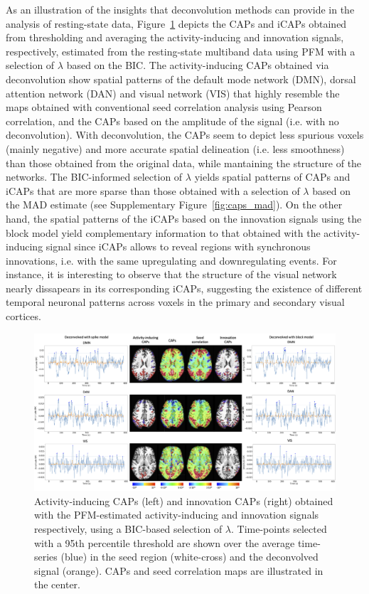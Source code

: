 As an illustration of the insights that deconvolution methods can provide in the analysis of resting-state data, Figure~\ref{fig:caps} depicts the CAPs and iCAPs obtained from thresholding and averaging the activity-inducing and innovation signals, respectively, estimated from the resting-state multiband data using PFM with a selection of $\lambda$ based on the BIC. The activity-inducing CAPs obtained via deconvolution show spatial patterns of the default mode network (DMN), dorsal attention network (DAN) and visual network (VIS) that highly resemble the maps obtained with conventional seed correlation analysis using Pearson correlation, and the CAPs based on the amplitude of the signal (i.e. with no deconvolution). With deconvolution, the CAPs seem to depict less spurious voxels (mainly negative) and more accurate spatial delineation (i.e. less smoothness) than those obtained from the original data, while mantaining the structure of the networks. The BIC-informed selection of $\lambda$ yields spatial patterns of CAPs and iCAPs that are more sparse than those obtained with a selection of $\lambda$ based on the MAD estimate (see Supplementary Figure~\ref{fig:caps_mad}). On the other hand, the spatial patterns of the iCAPs based on the innovation signals using the block model yield complementary information to that obtained with the activity-inducing signal since iCAPs allows to reveal regions with synchronous innovations, i.e. with the same upregulating and downregulating events. For instance, it is interesting to observe that the structure of the visual network nearly dissapears in its corresponding iCAPs, suggesting the existence of different temporal neuronal patterns across voxels in the primary and secondary visual cortices. 

\begin{figure}[t!]
    \begin{center}
        \includegraphics[width=\textwidth]{figures/caps.png}
    \end{center}
    \caption{Activity-inducing CAPs (left) and innovation CAPs (right) obtained with the PFM-estimated activity-inducing and innovation signals respectively, using a BIC-based selection of $\lambda$. Time-points selected with a 95th percentile threshold are shown over the average time-series (blue) in the seed region (white-cross) and the deconvolved signal (orange). CAPs and seed correlation maps are illustrated in the center.}
\label{fig:caps}
\end{figure}


